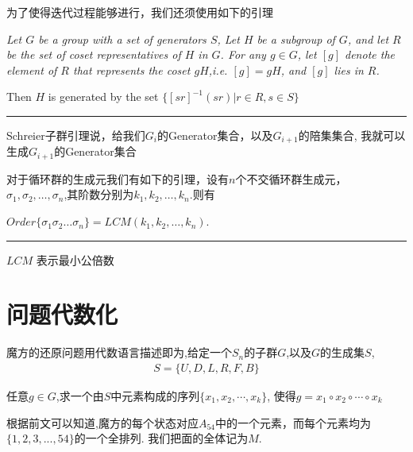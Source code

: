 \documentclass{beamer}
\begin{document}
\begin{frame}
为了使得迭代过程能够进行，我们还须使用如下的引理
\begin{lemma}
    {
        \itshape
        Let $G$ be a group with a set of  generators $S$, Let $H$ be a subgroup 
        of $G$, and let $R$ be the set of coset representatives of 
        $H$ in $G$. For any $g\in G$, let $[g]$ denote the element 
        of $R$ that represents the coset $gH$,{\rm i.e.} 
        $[g] = gH$, and $[g]$ lies in $R$.
        
        Then $H$ is generated by the set $\{[sr]^{-1}(sr)\big|r\in R, s\in S \}$
    }
\end{lemma}

\noindent\rule{1\linewidth}{2pt}
    
{\kaishu Schreier子群引理说，给我们$G_i$的Generator集合，以及$G_{i+1}$的陪集集合,
我就可以生成$G_{i+1}$的Generator集合}
\end{frame} 

\begin{frame}
对于循环群的生成元我们有如下的引理，设有$n$个不交循环群生成元，
$\sigma_1,\sigma_2,\ldots,\sigma_n$,其阶数分别为$k_1,k_2,\ldots,k_n$.则有
    
\vspace*{1em}
\begin{lemma}[循环群的阶]
    $Order\{\sigma_1\sigma_2\ldots\sigma_n \} = {LCM}(k_1,k_2,\ldots,k_n)$.
\end{lemma}

\vspace*{6em}
\noindent\rule{1\linewidth}{2pt}

{
    \kaishu 
    $LCM$ 表示最小公倍数
}
\end{frame} 






\section{问题代数化}
\begin{frame}
魔方的还原问题用代数语言描述即为,给定一个$S_n$的子群$G$,以及$G$的生成集$S$,
\begin{align}
    S = \{U,D,L,R,F,B\}	
\end{align}

任意$g\in G$,求一个由$S$中元素构成的序列$\{x_1,x_2,\cdots,x_k \}$,
使得$g = x_1\circ x_2\circ \cdots\circ x_k$

根据前文可以知道,魔方的每个状态对应$A_{54}$中的一个元素，而每个元素均为$\{1,2,3,...,54\}$的一个全排列.
我们把面的全体记为$M$.
\end{frame} 
\end{document}
